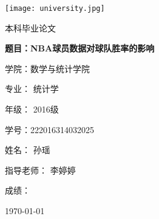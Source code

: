 \documentclass{report}
\begin{document}
	
	\begin{titlepage}
		\centering
		\texttt{[image: university.jpg]}\par
		\vspace{1cm}
		{\scshape\LARGE 本科毕业论文 \par}
		\vspace{1cm}
		{\scshape\LARGE\bfseries 题目：NBA球员数据对球队胜率的影响\par}
		\vspace{1cm}
		{\large 学院：数学与统计学院\par}
		\vspace{0.5cm}
		{\large 专业： 统计学\par}
		\vspace{0.5cm}
		{\large 年级： 2016级\par}
		\vspace{0.5cm}
		{\large 学号：222016314032025\par}
		\vspace{0.5cm}
		{\large 姓名： 孙瑶\par}
		\vspace{0.5cm}
		{\large 指导老师： 李婷婷\par}
		\vspace{0.5cm}
		{\large 成绩：\par}
		
		\vfill
		
		{\large \today\par}
	\end{titlepage}
	
\end{document}
